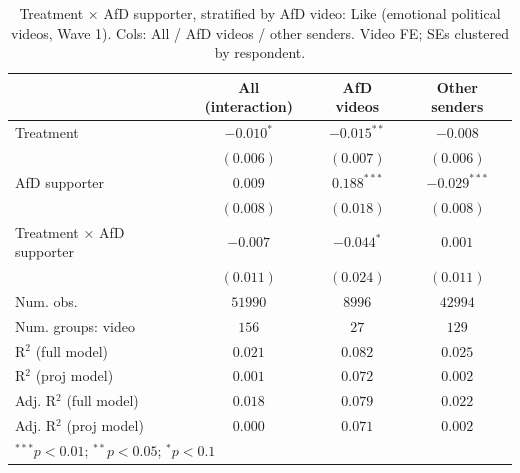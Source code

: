 
\begin{table}
\begin{center}
\begin{tabular}{l c c c}
\hline
 & All (interaction) & AfD videos & Other senders \\
\hline
Treatment                 & $-0.010^{*}$ & $-0.015^{**}$ & $-0.008$       \\
                          & $(0.006)$    & $(0.007)$     & $(0.006)$      \\
AfD supporter             & $0.009$      & $0.188^{***}$ & $-0.029^{***}$ \\
                          & $(0.008)$    & $(0.018)$     & $(0.008)$      \\
Treatment × AfD supporter & $-0.007$     & $-0.044^{*}$  & $0.001$        \\
                          & $(0.011)$    & $(0.024)$     & $(0.011)$      \\
\hline
Num. obs.                 & $51990$      & $8996$        & $42994$        \\
Num. groups: video        & $156$        & $27$          & $129$          \\
R$^2$ (full model)        & $0.021$      & $0.082$       & $0.025$        \\
R$^2$ (proj model)        & $0.001$      & $0.072$       & $0.002$        \\
Adj. R$^2$ (full model)   & $0.018$      & $0.079$       & $0.022$        \\
Adj. R$^2$ (proj model)   & $0.000$      & $0.071$       & $0.002$        \\
\hline
\multicolumn{4}{l}{\scriptsize{$^{***}p<0.01$; $^{**}p<0.05$; $^{*}p<0.1$}}
\end{tabular}
\caption{Treatment × AfD supporter, stratified by AfD video: Like (emotional political videos, Wave 1). Cols: All / AfD videos / other senders. Video FE; SEs clustered by respondent.}
\label{tab:afd_video_hetero_like}
\end{center}
\end{table}
